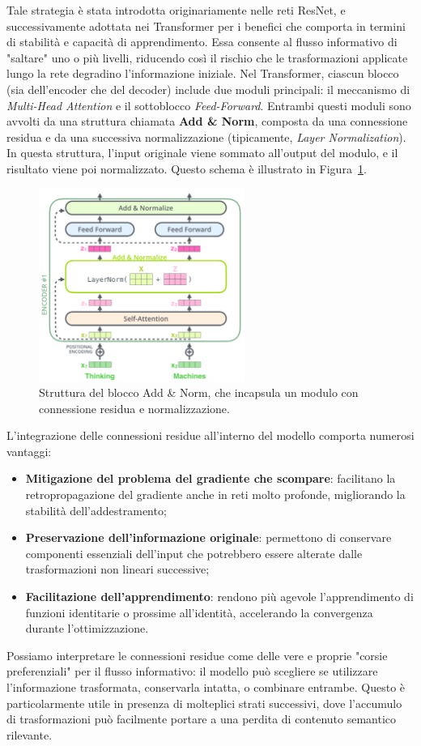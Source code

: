 Tale strategia è stata introdotta originariamente nelle reti ResNet, e successivamente adottata nei Transformer per i benefici che comporta in termini di stabilità e capacità di apprendimento. Essa consente al flusso informativo di "saltare" uno o più livelli, riducendo così il rischio che le trasformazioni applicate lungo la rete degradino l’informazione iniziale. Nel Transformer, ciascun blocco (sia dell’encoder che del decoder) include due moduli principali: il meccanismo di \textit{Multi-Head Attention} e il sottoblocco \textit{Feed-Forward}. Entrambi questi moduli sono avvolti da una struttura chiamata \textbf{Add \& Norm}, composta da una connessione residua e da una successiva normalizzazione (tipicamente, \textit{Layer Normalization}). In questa struttura, l’input originale viene sommato all’output del modulo, e il risultato viene poi normalizzato. Questo schema è illustrato in Figura~\ref{fig:ResAddon}.
\begin{figure}
    \centering
    \includegraphics[width=0.6\textwidth]{figure/ResidualAddon.png}
    \caption{Struttura del blocco Add \& Norm, che incapsula un modulo con connessione residua e normalizzazione.}
    \label{fig:ResAddon}
\end{figure}
L’integrazione delle connessioni residue all’interno del modello comporta numerosi vantaggi:
\begin{itemize}
    \item \textbf{Mitigazione del problema del gradiente che scompare}: facilitano la retropropagazione del gradiente anche in reti molto profonde, migliorando la stabilità dell’addestramento;
    \item \textbf{Preservazione dell’informazione originale}: permettono di conservare componenti essenziali dell’input che potrebbero essere alterate dalle trasformazioni non lineari successive;
    \item \textbf{Facilitazione dell’apprendimento}: rendono più agevole l’apprendimento di funzioni identitarie o prossime all’identità, accelerando la convergenza durante l’ottimizzazione.
\end{itemize}
Possiamo interpretare le connessioni residue come delle vere e proprie "corsie preferenziali" per il flusso informativo: il modello può scegliere se utilizzare l’informazione trasformata, conservarla intatta, o combinare entrambe. Questo è particolarmente utile in presenza di molteplici strati successivi, dove l’accumulo di trasformazioni può facilmente portare a una perdita di contenuto semantico rilevante.

